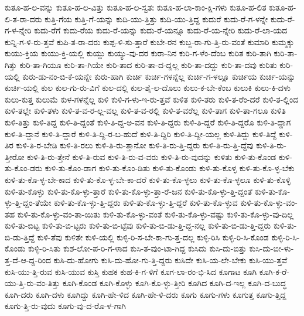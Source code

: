 {ಕುತೂ-ಹ-ಲ-ವನ್ನು
ಕುತೂ-ಹ-ಲ-ವಿತ್ತು
ಕುತೂ-ಹ-ಲ-ಸ್ವತಃ
ಕುತೂ-ಹ-ಲಾ-ಕಾಂ-ಕ್ಷಿ-ಗಳು
ಕುತೂ-ಹ-ಲಿತ
ಕುತೂ-ಹ-ಲಿ-ತ-ರಾ-ದರು
ಕುತ್ತಿ-ಗೆಯ
ಕುತ್ತಿ-ಗೆ-ಯನ್ನು
ಕುದಿ-ಯು-ತ್ತಿತ್ತು
ಕುದಿ-ಯು-ತ್ತಿದ್ದ
ಕುದುರೆ
ಕುದು-ರೆ-ಗ-ಳನ್ನೇ
ಕುದು-ರೆ-ಗ-ಳ-ನ್ನೇರಿ
ಕುದು-ರೆಗೆ
ಕುದು-ರೆಯ
ಕುದು-ರೆ-ಯನ್ನು
ಕುದು-ರೆ-ಯನ್ನೂ
ಕುದು-ರೆ-ಯ-ನ್ನೇರಿ
ಕುದು-ರೆ-ಲಾ-ಯದ
ಕುನ್ನಿ-ಗ-ಳಿ-ರು-ತ್ತವೆ
ಕುಪಿ-ತ-ರಾ-ದರು
ಕುಪ್ಪ-ಳಿ-ಸು-ತ್ತಾರೆ
ಕುಬೇ-ರನ
ಕುಬ್ಜ-ರಾ-ಗು-ತ್ತಿ-ರು-ವಂತೆ
ಕುಮಾರಿ
ಕುಮ್ಮಕ್ಕು
ಕುಯು-ಕ್ತಿಯ
ಕುಯು-ಕ್ತಿ-ಯಲ್ಲಿ
ಕುಯ್ದು
ಕುಯ್ಯು-ವು-ದರ
ಕುರಾ-ನಿನ
ಕುರಿ-ಗ-ಳೆಂ-ದೆಂಬ
ಕುರಿತ
ಕುರಿ-ತಾಗಿ
ಕುರಿ-ತಾ-ಗಿತ್ತು
ಕುರಿ-ತಾ-ಗಿಯೂ
ಕುರಿ-ತಾ-ಗಿಯೇ
ಕುರಿ-ತಾದ
ಕುರಿ-ತಾ-ದ-ದ್ದಲ್ಲ
ಕುರಿ-ತಾ-ದದ್ದು
ಕುರಿ-ತಾ-ದವು
ಕುರಿತು
ಕುರಿ-ಯಲ್ಲಿ
ಕುರು-ಡು-ನಂ-ಬಿ-ಕೆ-ಯನ್ನೇ
ಕುರು-ಹಾಗಿ
ಕುರ್ಚಿ
ಕುರ್ಚಿ-ಗಳನ್ನೆಲ್ಲ
ಕುರ್ಚಿ-ಗ-ಳಲ್ಲೂ
ಕುರ್ಚಿಯ
ಕುರ್ಚಿ-ಯನ್ನು
ಕುರ್ಚಿ-ಯಲ್ಲಿ
ಕುಲ
ಕುಲ-ಗು-ರು-ವಿಗೆ
ಕುಲ-ದಲ್ಲಿ
ಕುಲ-ಶೈ-ಲ-ದೊಲು
ಕುಲು-ಕ-ಬೇ-ಕೆಂಬ
ಕುಲುಕಿ
ಕುಲು-ಕಿ-ದಳು
ಕುಲು-ಕುತ್ತ
ಕುಲುಮೆ
ಕುಳ-ಗಳನ್ನೆಲ್ಲ
ಕುಳಿ
ಕುಳಿ-ಗ-ಳು-ಇ-ರು-ತ್ತವೆ
ಕುಳಿತ
ಕುಳಿ-ತರು
ಕುಳಿ-ತ-ರೆಂ-ದರೆ
ಕುಳಿ-ತ-ಲ್ಲಿಂದ
ಕುಳಿ-ತಲ್ಲೇ
ಕುಳಿ-ತಳು
ಕುಳಿ-ತ-ವ-ರ-ಲ್ಲ-ವಲ್ಲ
ಕುಳಿ-ತ-ವ-ರಲ್ಲಿ
ಕುಳಿ-ತ-ವರೆಲ್ಲ
ಕುಳಿ-ತಾಗ
ಕುಳಿ-ತಾ-ಗಲೂ
ಕುಳಿತಿ
ಕುಳಿ-ತಿತ್ತು
ಕುಳಿ-ತಿದ್ದ
ಕುಳಿ-ತಿ-ದ್ದಂತೆ
ಕುಳಿ-ತಿ-ದ್ದ-ಅ-ವನ
ಕುಳಿ-ತಿ-ದ್ದರು
ಕುಳಿ-ತಿ-ದ್ದರೆ
ಕುಳಿ-ತಿ-ದ್ದರೊ
ಕುಳಿ-ತಿ-ದ್ದಾಗ
ಕುಳಿ-ತಿ-ದ್ದಾನೆ
ಕುಳಿ-ತಿ-ದ್ದಾರೆ
ಕುಳಿ-ತಿ-ದ್ದಿ-ರ-ಬ-ಹುದೆ
ಕುಳಿ-ತಿ-ದ್ದಿರಿ
ಕುಳಿ-ತಿ-ದ್ದೀ-ಯಲ್ಲ
ಕುಳಿ-ತಿದ್ದು
ಕುಳಿ-ತಿದ್ದೆ
ಕುಳಿ-ತಿರ
ಕುಳಿ-ತಿ-ರ-ಬೇಡಿ
ಕುಳಿ-ತಿ-ರಲು
ಕುಳಿ-ತಿ-ರು-ತ್ತಾನೋ
ಕುಳಿ-ತಿ-ರು-ತ್ತಿ-ದ್ದರು
ಕುಳಿ-ತಿ-ರು-ತ್ತಿ-ದ್ದೆವು
ಕುಳಿ-ತಿ-ರು-ತ್ತೀರೋ
ಕುಳಿ-ತಿ-ರು-ತ್ತೇನೆ
ಕುಳಿ-ತಿ-ರುವ
ಕುಳಿ-ತಿ-ರು-ವ-ವರು
ಕುಳಿ-ತಿ-ರು-ವುದನ್ನು
ಕುಳಿತು
ಕುಳಿ-ತು-ಕೊಂಡ
ಕುಳಿ-ತು-ಕೊಂ-ಡರು
ಕುಳಿ-ತು-ಕೊಂ-ಡಾಗ
ಕುಳಿ-ತು-ಕೊಂ-ಡಿತು
ಕುಳಿ-ತು-ಕೊಂಡು
ಕುಳಿ-ತು-ಕೊಳ್ಳ
ಕುಳಿ-ತು-ಕೊ-ಳ್ಳ-ಬೆಕು
ಕುಳಿ-ತು-ಕೊ-ಳ್ಳ-ಬೇ-ಕಾದ
ಕುಳಿ-ತು-ಕೊ-ಳ್ಳ-ಬೇ-ಕಾ-ದರೆ
ಕುಳಿ-ತು-ಕೊ-ಳ್ಳಲು
ಕುಳಿ-ತು-ಕೊ-ಳ್ಳಲೂ
ಕುಳಿ-ತು-ಕೊಳ್ಳಿ
ಕುಳಿ-ತು-ಕೊಳ್ಳು
ಕುಳಿ-ತು-ಕೊ-ಳ್ಳು-ತ್ತಾರೆ
ಕುಳಿ-ತು-ಕೊ-ಳ್ಳು-ತ್ತಾ-ರೆ-ಜನ
ಕುಳಿ-ತು-ಕೊ-ಳ್ಳು-ತ್ತಿ-ದ್ದಂತೆ
ಕುಳಿ-ತು-ಕೊ-ಳ್ಳು-ತ್ತಿ-ದ್ದಂ-ತೆಯೇ
ಕುಳಿ-ತು-ಕೊ-ಳ್ಳು-ತ್ತಿ-ದ್ದರು
ಕುಳಿ-ತು-ಕೊ-ಳ್ಳು-ತ್ತಿ-ದ್ದರೆ
ಕುಳಿ-ತು-ಕೊ-ಳ್ಳುವ
ಕುಳಿ-ತು-ಕೊ-ಳ್ಳು-ವಂ-ತಹ
ಕುಳಿ-ತು-ಕೊ-ಳ್ಳು-ವಂ-ತಾ-ಯಿತು
ಕುಳಿ-ತು-ಕೊ-ಳ್ಳು-ವಂತೆ
ಕುಳಿ-ತು-ಕೊ-ಳ್ಳು-ವಷ್ಟು
ಕುಳಿ-ತು-ಕೊ-ಳ್ಳು-ವು-ದಿಲ್ಲ
ಕುಳಿ-ತು-ಬಿಟ್ಟ
ಕುಳಿ-ತು-ಬಿ-ಟ್ಟರು
ಕುಳಿ-ತು-ಬಿ-ಟ್ಟೆವು
ಕುಳಿ-ತು-ಬಿ-ಡು-ತ್ತಿ-ದ್ದ-ನಲ್ಲ
ಕುಳಿ-ತು-ಬಿ-ಡು-ತ್ತಿ-ದ್ದರು
ಕುಳಿ-ತು-ಬಿ-ಡು-ತ್ತಿದ್ದೆ
ಕುಳಿ-ತೆವು
ಕುಳಿತೇ
ಕುಳಿ-ಯಲ್ಲಿ
ಕುಳ್ಳಿ-ರಿ-ಸ-ಬೇ-ಕಾ-ಗು-ತ್ತ-ದಲ್ಲ
ಕುಳ್ಳಿ-ರಿಸಿ
ಕುಳ್ಳಿ-ರಿ-ಸಿ-ಕೊಂಡ
ಕುಳ್ಳಿ-ರಿ-ಸಿ-ಕೊಂಡು
ಕುಳ್ಳಿ-ರಿ-ಸಿತು
ಕುಶ-ಲೋ-ಪ-ರಿ-ಗ-ಳಾದ
ಕುಸಿ-ತ-ವುಂ-ಟಾ-ಗಿದ್ದ
ಕುಸಿದು
ಕುಸಿ-ದು-ಬಿತ್ತು
ಕುಸಿ-ದು-ಬೀ-ಳು-ತ್ತ-ದೆ-ಆ-ದ್ದ-ರಿಂದ
ಕುಸಿ-ದು-ಹೋಗು
ಕುಸಿ-ದು-ಹೋ-ಗು-ತ್ತಿ-ದ್ದರು
ಕುಸಿದೇ
ಕುಸಿ-ಯ-ಲೇ-ಬೇಕು
ಕುಸಿ-ಯು-ತ್ತವೆ
ಕುಸಿ-ಯು-ತ್ತಿ-ರುವ
ಕುಸಿ-ಯುವ
ಕುಸ್ತಿ
ಕುಹಕ
ಕುಹ-ಕಿ-ಗ-ಳಿಗೆ
ಕೂಗ-ಲಾ-ರಂ-ಭಿ-ಸಿದ
ಕೂಗಾಟ
ಕೂಗಿ
ಕೂಗಿ-ಕ-ರೆ-ಯು-ತ್ತಿ-ರು-ವಂ-ತಿತ್ತು
ಕೂಗಿ-ಕೊಂಡ
ಕೂಗಿ-ಕೊಳ್ಳು
ಕೂಗಿ-ಕೊ-ಳ್ಳು-ತ್ತೀರಿ
ಕೂಗಿದ
ಕೂಗಿ-ದ-ಇಲ್ಲ
ಕೂಗಿ-ದ-ಬುದ್ಧ
ಕೂಗಿ-ದರು
ಕೂಗಿ-ದಳು
ಕೂಗಿದ್ದು
ಕೂಗಿ-ಹೇ-ಳಿದ
ಕೂಗಿ-ಹೇ-ಳಿ-ದರು
ಕೂಗು
ಕೂಗು-ಗಳು
ಕೂಗುತ್ತ
ಕೂಗು-ತ್ತಿದ್ದ
ಕೂಗು-ತ್ತಿ-ರು-ವುದು
ಕೂಗು-ವು-ದ-ರೊ-ಳ-ಗಾಗಿ
}

